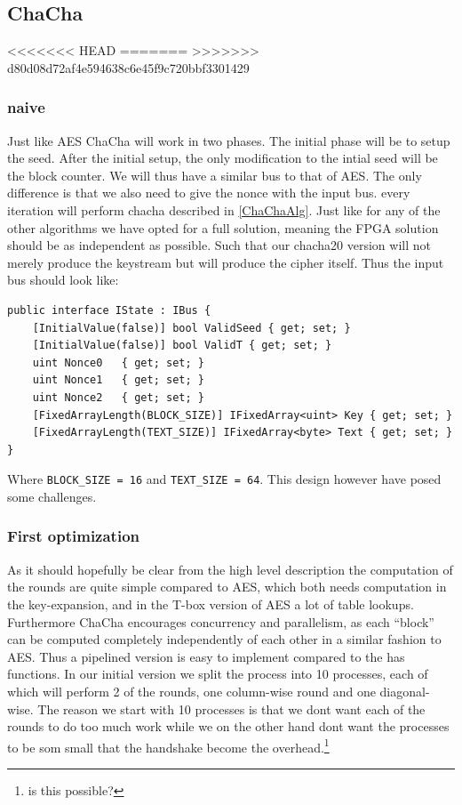 \documentclass[a4paper]{article}
\begin{document}
\begin{enumerate}
\subsection{ChaCha}
<<<<<<< HEAD
\label{sec:org0e103e5}
=======
\label{sec:orgae4d249}
>>>>>>> d80d08d72af4e594638c6e45f9c720bbf3301429

\subsubsection{naive}
\label{ChaChaNaive}
Just like AES ChaCha will work in two phases. The initial phase will be to setup the seed. After the initial setup, the only modification to the intial seed will be the block counter. We will thus have a similar bus to that of AES. The only difference is that we also need to give the nonce with the input bus. every iteration will perform chacha described in \ref{ChaChaAlg}. Just like for any of the other algorithms we have opted for a full solution, meaning the FPGA solution should be as independent as possible. Such that our chacha20 version will not merely produce the keystream but will produce the cipher itself. Thus the input bus should look like:
\begin{verbatim}
public interface IState : IBus {
    [InitialValue(false)] bool ValidSeed { get; set; }
    [InitialValue(false)] bool ValidT { get; set; }
    uint Nonce0   { get; set; }
    uint Nonce1   { get; set; }
    uint Nonce2   { get; set; }
    [FixedArrayLength(BLOCK_SIZE)] IFixedArray<uint> Key { get; set; }
    [FixedArrayLength(TEXT_SIZE)] IFixedArray<byte> Text { get; set; }
}
\end{verbatim}
Where \texttt{BLOCK\_SIZE = 16} and \texttt{TEXT\_SIZE = 64}. This design however have posed some challenges.
\subsubsection{First optimization}
\label{ChaCha1}
As it should hopefully be clear from the high level description the computation of the rounds are quite simple compared to AES, which both needs computation in the key-expansion, and in the T-box version of AES a lot of table lookups. Furthermore ChaCha encourages concurrency and parallelism, as each ``block'' can be computed completely independently of each other in a similar fashion to AES. Thus a pipelined version is easy to implement compared to the has functions. In our initial version we split the process into 10 processes, each of which will perform 2 of the rounds, one column-wise round and one diagonal-wise. The reason we start with 10 processes is that we dont want each of the rounds to do too much work while we on the other hand dont want the processes to be som small that the handshake become the overhead.\footnote{is this possible?}


\end{enumerate}
\end{document}
